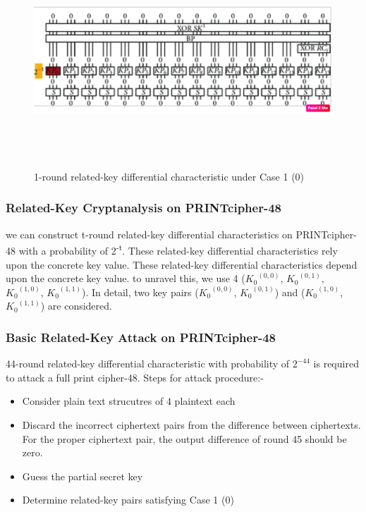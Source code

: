 \documentclass[journal=tosc,preprint]{iacrtrans}
\begin{document}
\begin{figure}[ht]
	\centering
	\includegraphics[height=8cm, width=12cm]{pics/oneround.png}
	\caption{1-round related-key differential characteristic under Case 1 (0)}
\end{figure}


\newpage
\subsubsection{Related-Key Cryptanalysis on PRINTcipher-48}
we can construct t-round related-key differential characteristics on PRINTcipher-48 with a probability of 2\textsuperscript{-t}. These related-key differential characteristics rely upon the concrete key value. These related-key differential characteristics depend upon the concrete key value. to unravel this, we use 4 (\({K_0}^{(0,0)}\), \({K_0}^{(0,1)}\), \({K_0}^{(1,0)}\), \({K_0}^{(1,1)}\)). In detail, two key pairs (\({K_0}^{(0,0)}\), \({K_0}^{(0,1)}\)) and (\({K_0}^{(1,0)}\), \({K_0}^{(1,1)}\)) are considered.

\subsubsection{Basic Related-Key Attack on PRINTcipher-48}
44-round related-key differential characteristic with probability of \(2^{-44}\) is required to attack a full print cipher-48.
Steps for attack procedure:-
\begin{itemize}
	\item Consider plain text strucutres of 4 plaintext each
	\item Discard the incorrect ciphertext pairs from the difference between
	ciphertexts. For the proper ciphertext pair, the output difference of round 45 should be zero.
	\item Guess the partial secret key
	\item Determine related-key pairs satisfying Case 1 (0)
\end{itemize}
\end{document}
